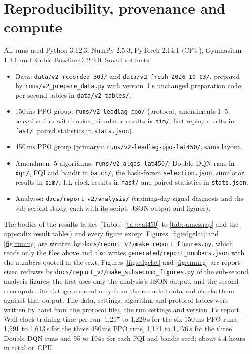 \documentclass[12pt,a4paper]{article}
\begin{document}
\section{Reproducibility, provenance and compute}\label{app:repro}
All runs used Python 3.12.3, NumPy 2.5.3, PyTorch 2.14.1 (CPU), Gymnasium 1.3.0 and
Stable-Baselines3 2.9.0.
Saved artifacts:
\begin{itemize}
\item Data: \nolinkurl{data/v2-recorded-30d/} and \nolinkurl{data/v2-fresh-2026-10-03/},
prepared by \nolinkurl{runs/v2_prepare_data.py} with version~1's unchanged preparation code;
per-second tables in \nolinkurl{data/v2-tables/}.
\item 150\,ms PPO group: \texttt{runs/v2-leadlag-ppo/} (protocol, amendments 1--5, selection
files with hashes, simulator results in \texttt{sim/}, fast-replay results in \texttt{fast/},
paired statistics in \texttt{stats.json}).
\item 450\,ms PPO group (primary): \texttt{runs/v2-leadlag-ppo-lat450/}, same layout.
\item Amendment-5 algorithms: \nolinkurl{runs/v2-algos-lat450/}: Double DQN runs in
\texttt{dqn/}, FQI and bandit in \texttt{batch/}, the hash-frozen \texttt{selection.json},
simulator results in \texttt{sim/}, HL-clock results in \texttt{fast/} and paired statistics
in \texttt{stats.json}.
\item Analyses: \texttt{docs/report\_v2/analysis/} (training-day signal diagnosis and the
sub-second study, each with its script, JSON output and figures).
\end{itemize}
The bodies of the results tables (Tables~\ref{tab:val450} to \ref{tab:samesnap} and the
appendix result tables) and every figure except Figures~\ref{fig:edgelat} and \ref{fig:timing}
are written by \texttt{docs/report\_v2/make\_report\_figures.py}, which reads only the files
above and also writes \texttt{generated/report\_numbers.json} with the numbers quoted in the
text. Figures~\ref{fig:edgelat} and \ref{fig:timing} are report-sized redraws by
\texttt{docs/report\_v2/make\_subsecond\_figures.py} of the sub-second analysis figures; the
first uses only the analysis's JSON output, and the second recomputes its histograms read-only
from the recorded data and checks them against that output.
The data, settings, algorithm and protocol tables were written by hand from the protocol files,
the run settings and version~1's report. Wall-clock training time per run: 1,217 to 1,229\,s for the six
150\,ms PPO runs, 1,591 to 1,613\,s for the three 450\,ms PPO runs, 1,171 to 1,176\,s for the
three Double DQN runs and 95 to 104\,s for each FQI and bandit seed; about 4.4 hours in total
on CPU.
\end{document}
